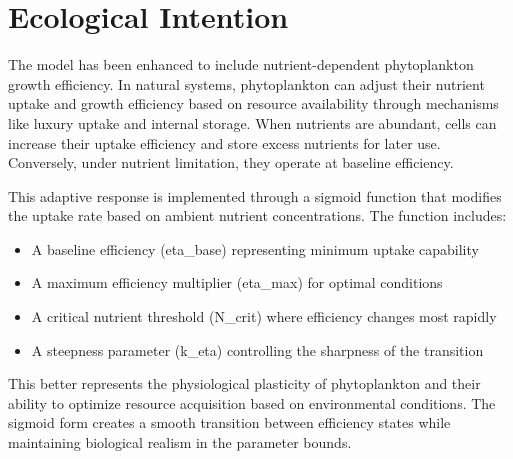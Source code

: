 \section{Ecological Intention}

The model has been enhanced to include nutrient-dependent phytoplankton growth efficiency. In natural systems, phytoplankton can adjust their nutrient uptake and growth efficiency based on resource availability through mechanisms like luxury uptake and internal storage. When nutrients are abundant, cells can increase their uptake efficiency and store excess nutrients for later use. Conversely, under nutrient limitation, they operate at baseline efficiency.

This adaptive response is implemented through a sigmoid function that modifies the uptake rate based on ambient nutrient concentrations. The function includes:
\begin{itemize}
\item A baseline efficiency (eta\_base) representing minimum uptake capability
\item A maximum efficiency multiplier (eta\_max) for optimal conditions  
\item A critical nutrient threshold (N\_crit) where efficiency changes most rapidly
\item A steepness parameter (k\_eta) controlling the sharpness of the transition
\end{itemize}

This better represents the physiological plasticity of phytoplankton and their ability to optimize resource acquisition based on environmental conditions. The sigmoid form creates a smooth transition between efficiency states while maintaining biological realism in the parameter bounds.
